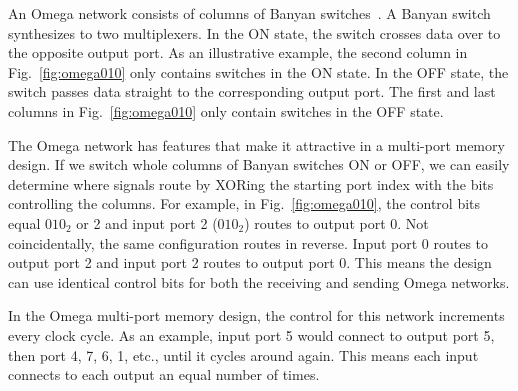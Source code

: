     An Omega network consists of columns of Banyan switches~\cite{f-scratch:wu,f-scratch:lawrie}. A Banyan switch synthesizes to two multiplexers. In the ON state, the switch crosses data over to the opposite output port. As an illustrative example, the second column in Fig.~\ref{fig:omega010} only contains switches in the ON state. In the OFF state, the switch passes data straight to the corresponding output port. The first and last columns in Fig.~\ref{fig:omega010} only contain switches in the OFF state.

The Omega network has features that make it attractive in a multi-port memory design. If we switch whole columns of Banyan switches ON or OFF, we can easily determine where signals route by XORing the starting port index with the bits controlling the columns. For example, in Fig.~\ref{fig:omega010}, the control bits equal $010_2$ or 2 and input port 2 ($010_2$) routes to output port 0. Not coincidentally, the same configuration routes in reverse. Input port 0 routes to output port 2 and input port 2 routes to output port 0. This means the design can use identical control bits for both the receiving and sending Omega networks.

In the Omega multi-port memory design, the control for this network increments every clock cycle. As an example, input port 5 would connect to output port 5, then port 4, 7, 6, 1, etc., until it cycles around again. This means each input connects to each output an equal number of times.

